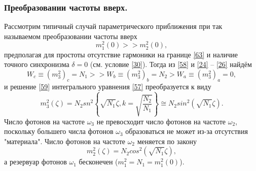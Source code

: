 \documentclass[a4paper]{article}
\begin{document}
	\subsubsection{Преобразовании частоты вверх.}
	Рассмотрим типичный случай параметрического приближения при так называемом преобразовании частоты вверх 
	\begin{equation}
		m_{1}^{2}(0)>>m_{2}^{2}(0),
		\label{64}
	\end{equation}
	предполагая для простоты отсутствие гармоники на границе \eqref{63} и наличие точного синхронизма $\delta=0$  (см. условие \eqref{30}). Тогда из \eqref{58} и \eqref{24} – \eqref{26} найдём 
	\begin{equation}
		W_{c}\equiv(m_{3}^{2})_{c}=N_{1}>>W_{b}\equiv(m_{3}^{2})_{b}=N_{2}>W_{a}\equiv(m_{3}^{2})_{a}=0,
		\label{65}
	\end{equation}
	и решение \eqref{59} интегрального уравнения \eqref{57} преобразуется к виду 
	\begin{equation}
		m_{3}^{2}(\zeta)=N_{2}sn^{2}\left\{\sqrt{N_{1}}\zeta,k=\sqrt{\frac{N_{2}}{N_{1}}}\right\}\cong N_{2}sin^{2}(\sqrt{N_{1}}\zeta).
		\tag{66b}
	 	\label{66_3}
	\end{equation}
	Число фотонов на частоте $\omega_{3}$  не превосходит число фотонов на частоте $\omega_{2}$, поскольку большего числа фотонов  $\omega_{3}$ образоваться не может из-за отсутствия "материала". Число фотонов на частоте $\omega_{2}$ меняется по закону
	\begin{equation}
		m_{2}^{2}(\zeta)=N_{2}cos^{2}(\sqrt{N_{1}}\zeta), \tag{66a}
		\label{66_2}
	\end{equation}
	а резервуар фотонов  $\omega_{1}$  бесконечен ($m_{1}^{2}=N_{1}=m_{1}^{2}(0)$). 
	\setcounter{equation}{66}
\end{document}
